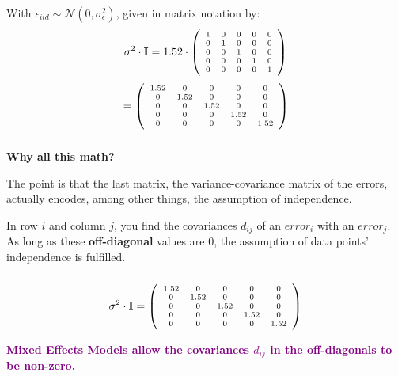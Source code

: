 \documentclass{beamer}
\begin{document}
\begin{frame}
    \frametitle{}
    With $\epsilon_{iid} \sim \mathcal{N}(0, \sigma^2_{\epsilon})$, given in matrix notation by:
    \begin{equation*}
        \scriptsize{\sigma^2 \cdot \mathbf{I} = 1.52 \cdot \left( \begin{array}{ccccc} 1 & 0 & 0 & 0 & 0 \\ 0 & 1 & 0 & 0 & 0 \\ 0 & 0 & 1 & 0 & 0 \\ 0 & 0 & 0 & 1 & 0 \\ 0 & 0 & 0 & 0 & 1 \end{array}\right)}
    \end{equation*}
    \begin{equation*}
        \scriptsize{= \left( \begin{array}{ccccc} 1.52 & 0 & 0 & 0 & 0 \\ 0 & 1.52 & 0 & 0 & 0 \\ 0 & 0 & 1.52 & 0 & 0 \\ 0 & 0 & 0 & 1.52 & 0 \\ 0 & 0 & 0 & 0 & 1.52 \end{array}\right)}
    \end{equation*}
\end{frame}

\begin{frame}
    \frametitle{}
    \textbf{Why all this math?}
    
    The point is that the last matrix, the variance-covariance matrix of the errors, actually encodes, among other things, the assumption of independence.

    In row $i$ and column $j$, you find the covariances $d_{ij}$ of an $error_i$ with an $error_j$. As long as these \textbf{off-diagonal} values are 0, the assumption of data points' independence is fulfilled.
\end{frame}

\begin{frame}
    \frametitle{}
    \begin{equation*}
        \scriptsize{\sigma^2 \cdot \mathbf{I} = \left( \begin{array}{ccccc} 1.52 & 0 & 0 & 0 & 0 \\ 0 & 1.52 & 0 & 0 & 0 \\ 0 & 0 & 1.52 & 0 & 0 \\ 0 & 0 & 0 & 1.52 & 0 \\ 0 & 0 & 0 & 0 & 1.52 \end{array}\right)}
    \end{equation*}
    
    \vspace{1cm}
    \textbf{\textcolor{purple}{Mixed Effects Models allow the covariances $d_{ij}$ in the off-diagonals to be non-zero.}}
\end{frame}
\end{document}
